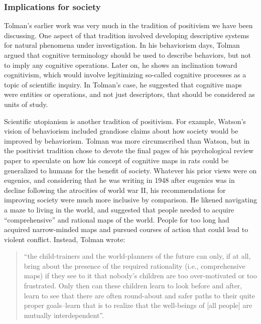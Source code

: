 \documentclass[
  oneside,
  12pt]{crumpbook}
\begin{document}
\hypertarget{implications-for-society}{%
\subsubsection{Implications for society}\label{implications-for-society}}

Tolman's earlier work was very much in the tradition of positivism we have been discussing. One aspect of that tradition involved developing descriptive systems for natural phenomena under investigation. In his behaviorism days, Tolman argued that cognitive terminology should be used to describe behaviors, but not to imply any cognitive operations. Later on, he shows an inclination toward cognitivism, which would involve legitimizing so-called cognitive processes as a topic of scientific inquiry. In Tolman's case, he suggested that cognitive maps were entities or operations, and not just descriptors, that should be considered as units of study.

Scientific utopianism is another tradition of positivism. For example, Watson's vision of behaviorism included grandiose claims about how society would be improved by behaviorism. Tolman was more circumscribed than Watson, but in the positivist tradition chose to devote the final pages of his psychological review paper to speculate on how his concept of cognitive maps in rats could be generalized to humans for the benefit of society. Whatever his prior views were on eugenics, and considering that he was writing in 1948 after eugenics was in decline following the atrocities of world war II, his recommendations for improving society were much more inclusive by comparison. He likened navigating a maze to living in the world, and suggested that people needed to acquire ``comprehensive'' and rational maps of the world. People for too long had acquired narrow-minded maps and pursued courses of action that could lead to violent conflict. Instead, Tolman wrote:

\begin{quote}
``the child-trainers and the world-planners of the future can only, if at all, bring about the presence of the required rationality (i.e., comprehensive maps) if they see to it that nobody's children are too over-motivated or too frustrated. Only then can these children learn to look before and after, learn to see that there are often round-about and safer paths to their quite proper goals--learn that is to realize that the well-beings of {[}all people{]} are mutually interdependent''.
\end{quote}
\end{document}
